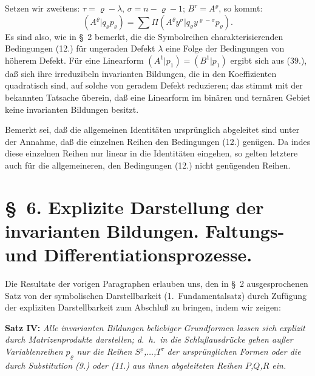 \documentclass[12pt,a4paper]{article}
\begin{document}
Setzen wir zweitens: $\tau = \varrho - \lambda$, $\sigma = n-\varrho-1$; $B^{\tau} = A^{\varrho}$, so kommt:
\begin{equation}\tag{39}
(A^{\varrho} | q_{\varrho} p_{\varrho}) = \sum \Pi (A^{\varrho} y^{\sigma} | q_{\varrho} y^{\varrho-\sigma} p_{\varrho}).
\end{equation}
Es sind also, wie in \S\ 2 bemerkt, die die Symbolreihen charakterisierenden Bedingungen (12.) für ungeraden Defekt $\lambda$ eine Folge der Bedingungen von höherem Defekt. Für eine Linearform $(A^{1} | p_{1}) = (B^{1} | p_{1})$ ergibt sich aus (39.), daß sich ihre irreduzibeln invarianten Bildungen, die in den Koeffizienten quadratisch sind, auf solche von geradem Defekt reduzieren; das stimmt mit der bekannten Tatsache überein, daß eine Linearform im binären und ternären Gebiet keine invarianten Bildungen besitzt.

Bemerkt sei, daß die allgemeinen Identitäten ursprünglich abgeleitet sind unter der Annahme, daß die einzelnen Reihen den Bedingungen (12.) genügen. Da indes diese einzelnen Reihen nur linear in die Identitäten eingehen, so gelten letztere auch für die allgemeineren, den Bedingungen (12.) nicht genügenden Reihen.

\section*{\S\ 6. Explizite Darstellung der invarianten Bildungen. Faltungs- und Differentiationsprozesse.}

Die Resultate der vorigen Paragraphen erlauben uns, den in \S\ 2 ausgesprochenen Satz von der symbolischen Darstellbarkeit (1.\ Fundamentalsatz) durch Zufügung der expliziten Darstellbarkeit zum Abschluß zu bringen, indem wir zeigen:

\medskip
\textbf{Satz IV:} \textit{Alle invarianten Bildungen beliebiger Grundformen lassen sich explizit durch Matrizenprodukte darstellen; d.\ h.\ in die Schlußausdrücke gehen außer Variablenreihen $p_{\varrho}$ nur die Reihen $S^{\varrho}$,$\ldots$,$T^{\tau}$ der ursprünglichen Formen oder die durch Substitution (9.) oder (11.) aus ihnen abgeleiteten Reihen $P$,$Q$,$R$ ein.}
\medskip
\end{document}
